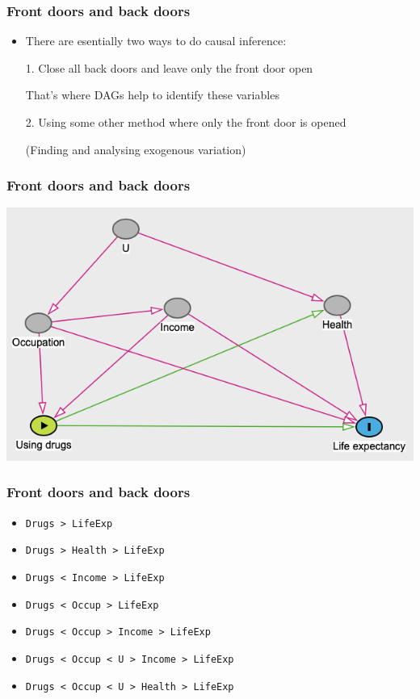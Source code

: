 \documentclass[aspectratio=43]{beamer}
\begin{document}
\begin{frame}
\frametitle{Front doors and back doors}
\centering

\begin{itemize}
  \item There are esentially two ways to do causal inference:
  \item[1.] Close all back doors and leave only the front door open
  \item[] That's where DAGs help to identify these variables
  \item[]
  \item[2.] Using some other method where only the front door is opened
  \item[] (Finding and analysing exogenous variation)
\end{itemize}

\end{frame}

\begin{frame}
\frametitle{Front doors and back doors}
\centering

\includegraphics[width = \textwidth]{../img/drugs_dag1}

\end{frame}

\begin{frame}
\frametitle{Front doors and back doors}
\centering

\begin{itemize}
  \item \texttt{Drugs > LifeExp}
  \item \texttt{Drugs > Health > LifeExp}
  \item \texttt{Drugs < Income > LifeExp}
  \item \texttt{Drugs < Occup > LifeExp}
  \item \texttt{Drugs < Occup > Income > LifeExp}
  \item \texttt{Drugs < Occup < U > Income > LifeExp}
  \item \texttt{Drugs < Occup < U > Health > LifeExp}
\end{itemize}

\end{frame}
\end{document}
